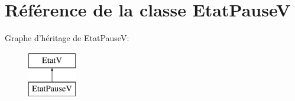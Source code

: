 \hypertarget{classEtatPauseV}{\section{Référence de la classe Etat\+Pause\+V}
\label{classEtatPauseV}
}
Graphe d'héritage de Etat\+Pause\+V\+:\begin{figure}[H]
\begin{center}
\leavevmode
\includegraphics[height=2.000000cm]{classEtatPauseV}
\end{center}
\end{figure}
